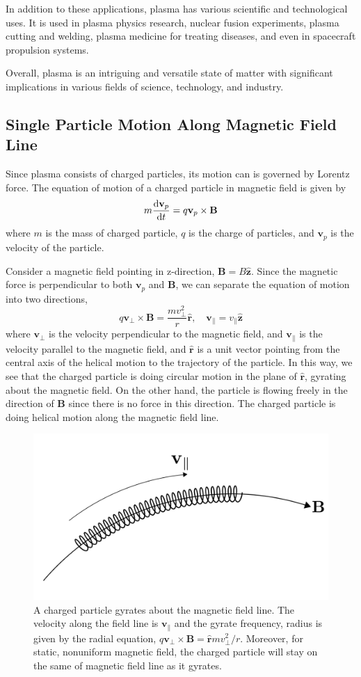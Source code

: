 In addition to these applications, plasma has various scientific and technological uses.
It is used in plasma physics research, nuclear fusion experiments, plasma cutting and welding, plasma medicine for treating diseases, and even in spacecraft propulsion systems.

Overall, plasma is an intriguing and versatile state of matter with significant implications in various fields of science, technology, and industry.

\subsection{Single Particle Motion Along Magnetic Field Line}
Since plasma consists of charged particles, its motion can is governed by Lorentz force. The equation of motion of a charged particle in magnetic field is given by
\[ m\dv{\mathbf{v}_p}{t} = q\mathbf{v}_p\times \mathbf{B} \]
where $m$ is the mass of charged particle, $q$ is the charge of particles, and $\mathbf{v}_p$ is the velocity of the particle.

Consider a magnetic field pointing in z-direction, $\mathbf{B}=B\mathbf{\hat{z}}$. Since the magnetic force is perpendicular to both $\mathbf{v}_p$ and $\mathbf{B}$, we can separate the equation of motion into two directions,
\[
	q\mathbf{v_{\perp}\times B} = \frac{mv_{\perp}^2}{r}\mathbf{\hat{r}},
	\quad
	\mathbf{v}_{\parallel} = v_{\parallel} \mathbf{\hat{z}} \]
where $\mathbf{v}_{\perp}$ is the velocity perpendicular to the magnetic field, and $\mathbf{v}_{\parallel}$ is the velocity parallel to the magnetic field, and $\mathbf{\hat{r}}$ is a unit vector pointing from the central axis of the helical motion to the trajectory of the particle. In this way, we see that the charged particle is doing circular motion in the plane of $\mathbf{\hat{r}}$, gyrating about the magnetic field. On the other hand, the particle is flowing freely in the direction of $\mathbf{B}$ since there is no force in this direction. The charged particle is doing helical motion along the magnetic field line.

\begin{figure}[htbp]
	\centering
	\includegraphics[width=0.7\linewidth]{img/gyrate-along-b-field}
	\caption{A charged particle gyrates about the magnetic field line. The velocity along the field line is $\mathbf{v}_{\parallel}$ and the gyrate frequency, radius is given by the radial equation, $q\mathbf{v_{\perp}\times B} = \mathbf{\hat{r}} mv_\perp^2/r$. Moreover, for static, nonuniform magnetic field, the charged particle will stay on the same of magnetic field line as it gyrates.}
	\label{fig:gyrate-along-b-field}
\end{figure}

